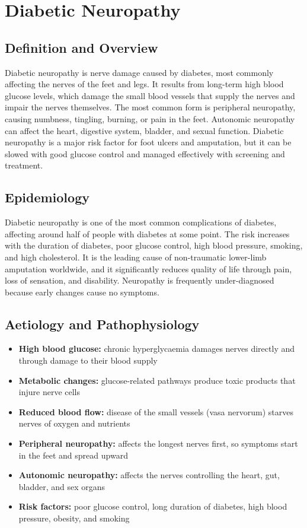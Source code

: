 \chapter{Diabetic Neuropathy}

\section*{Definition and Overview}
Diabetic neuropathy is nerve damage caused by diabetes, most commonly affecting the nerves of the feet and legs. It results from long-term high blood glucose levels, which damage the small blood vessels that supply the nerves and impair the nerves themselves. The most common form is peripheral neuropathy, causing numbness, tingling, burning, or pain in the feet. Autonomic neuropathy can affect the heart, digestive system, bladder, and sexual function. Diabetic neuropathy is a major risk factor for foot ulcers and amputation, but it can be slowed with good glucose control and managed effectively with screening and treatment.

\section*{Epidemiology}
Diabetic neuropathy is one of the most common complications of diabetes, affecting around half of people with diabetes at some point. The risk increases with the duration of diabetes, poor glucose control, high blood pressure, smoking, and high cholesterol. It is the leading cause of non-traumatic lower-limb amputation worldwide, and it significantly reduces quality of life through pain, loss of sensation, and disability. Neuropathy is frequently under-diagnosed because early changes cause no symptoms.

\section*{Aetiology and Pathophysiology}
\begin{itemize}
    \item \textbf{High blood glucose:} chronic hyperglycaemia damages nerves directly and through damage to their blood supply
    \item \textbf{Metabolic changes:} glucose-related pathways produce toxic products that injure nerve cells
    \item \textbf{Reduced blood flow:} disease of the small vessels (vasa nervorum) starves nerves of oxygen and nutrients
    \item \textbf{Peripheral neuropathy:} affects the longest nerves first, so symptoms start in the feet and spread upward
    \item \textbf{Autonomic neuropathy:} affects the nerves controlling the heart, gut, bladder, and sex organs
    \item \textbf{Risk factors:} poor glucose control, long duration of diabetes, high blood pressure, obesity, and smoking
\end{itemize}

